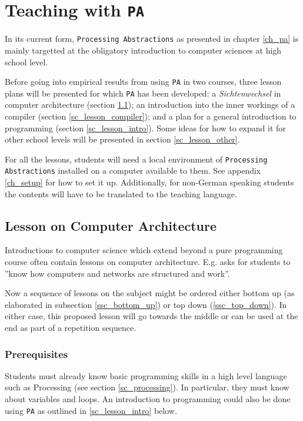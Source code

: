 
\chapter{Teaching with \texttt{PA}} \label{ch_teaching}
In its current form, \texttt{Processing Abstractions} as presented in chapter \ref{ch_pa} is mainly targetted at the obligatory introduction to computer sciences at high school level.

Before going into empirical results from using \texttt{PA} in two courses, three lesson plans will be presented for which \texttt{PA} has been developed: a \emph{Sichtenwechsel} in computer architecture (section \ref{sc_lesson_ca}); an introduction into the inner workings of a compiler (section \ref{sc_lesson_compiler}); and a plan for a general introduction to programming (section \ref{sc_lesson_intro}). Some ideas for how to expand it for other school levels will be presented in section \ref{sc_lesson_other}.

For all the lessons, students will need a local environment of \texttt{Processing Abstractions} installed on a computer available to them. See appendix \ref{ch_setup} for how to set it up. Additionally, for non-German speaking students the contents will have to be translated to the teaching language.

\section{Lesson on Computer Architecture} \label{sc_lesson_ca}
Introductions to computer science which extend beyond a pure programming course often contain lessons on computer architecture. E.g. \cite[p. 145]{Erz16} asks for students to ''know how computers and networks are structured and work''.

Now a sequence of lessons on the subject might be ordered either bottom up (as elaborated in subsection \ref{ssc_bottom_up}) or top down (\ref{ssc_top_down}). In either case, this proposed lesson will go towards the middle or can be used at the end as part of a repetition sequence.

\subsection{Prerequisites}
Students must already know basic programming skills in a high level language such as Processing (see section \ref{sc_processing}). In particular, they must know about variables and loops. An introduction to programming could also be done using \texttt{PA} as outlined in \ref{sc_lesson_intro} below.

